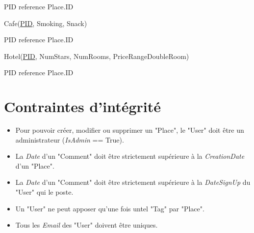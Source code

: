 \documentclass[a4paper,10pt]{article}
\begin{document}
PID reference Place.ID

\hspace{-0,5cm}Cafe(\underline{PID}, Smoking, Snack)

PID reference Place.ID

\hspace{-0,5cm}Hotel(\underline{PID}, NumStars, NumRooms, PriceRangeDoubleRoom)

PID reference Place.ID

\section{Contraintes d'intégrité}

\begin{itemize}
  \item Pour pouvoir créer, modifier ou supprimer un "Place", le "User" doit être un administrateur (\emph{IsAdmin} == True).
  \item La \emph{Date} d'un "Comment" doit être strictement supérieure à la \emph{CreationDate} d'un "Place".
  \item La \emph{Date} d'un "Comment" doit être strictement supérieure à la \emph{DateSignUp} du "User" qui le poste.
  \item Un "User" ne peut apposer qu'une fois untel "Tag" par "Place".
  \item Tous les \emph{Email} des "User" doivent être uniques.
\end{itemize}
\end{document}

